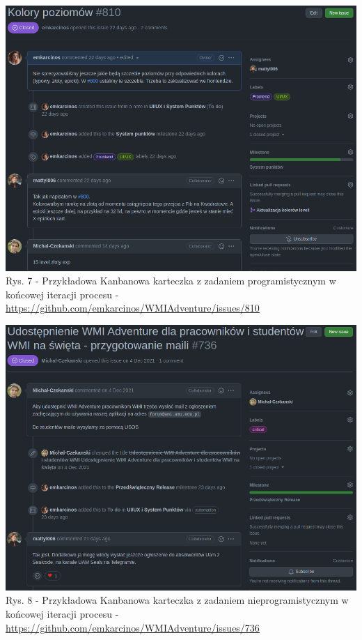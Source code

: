 \documentclass{article}
\begin{document}
\begin{center}
    \includegraphics[scale=0.5]{card_implementation_task_example.png}
    \newline
    Rys. 7 - Przykładowa Kanbanowa karteczka z zadaniem programistycznym w końcowej iteracji procesu - \url{https://github.com/emkarcinos/WMIAdventure/issues/810}
\end{center}
\begin{center}
    \includegraphics[scale=0.5]{card_other_task_example.png}
    \newline
    Rys. 8 - Przykładowa Kanbanowa karteczka z zadaniem nieprogramistycznym w końcowej iteracji procesu - \url{https://github.com/emkarcinos/WMIAdventure/issues/736}
\end{center}
\end{document}
